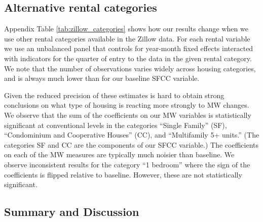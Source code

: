 \subsection{Alternative rental categories}

Appendix Table \ref{tab:zillow_categories} shows how our results change when we 
use other rental categories available in the Zillow data.
For each rental variable we use an unbalanced panel that controls for
year-month fixed effects interacted with indicators for the quarter of entry
to the data in the given rental category.
We note that the number of observations varies widely across housing categories, 
and is always much lower than for our baseline SFCC variable.

Given the reduced precision of these estimates is hard to obtain strong 
conclusions on what type of housing is reacting more strongly to MW changes.
We observe that the sum of the coefficients on our MW variables is 
statistically significant at conventional levels in the categories 
``Single Family'' (SF),  ``Condominium and Cooperative Houses'' (CC), and 
``Multifamily 5+ units.''
(The categories SF and CC are the components of our SFCC variable.)
The coefficients on each of the MW measures are typically much noisier than
baseline.
We observe inconsistent results for the category ``1 bedroom'' where the sign 
of the coefficients is flipped relative to baseline.
However, these are not statistically significant.


\subsection{Summary and Discussion}
\label{sec:results_discussion}

